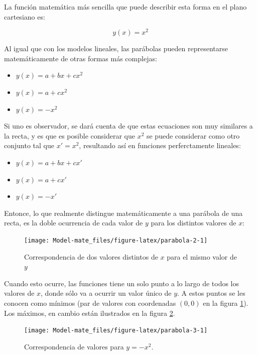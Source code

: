 \documentclass[
]{book}
\providecommand{\tightlist}{%
  \setlength{\itemsep}{0pt}\setlength{\parskip}{0pt}}
\begin{document}
La función matemática más sencilla que puede describir esta forma en el plano cartesiano es:

\begin{equation}
    y(x) = x^2
\end{equation}

Al igual que con los modelos lineales, las parábolas pueden representarse matemáticamente de otras formas más complejas:

\begin{itemize}
\tightlist
\item
  \(y(x) = a + bx + cx^2\)
\item
  \(y(x) = a + cx^2\)
\item
  \(y(x) = -x^2\)
\end{itemize}

Si uno es observador, se dará cuenta de que estas ecuaciones son muy similares a la recta, y es que es posible considerar que \(x^2\) se puede considerar como otro conjunto tal que \(x' = x^2\), resultando así en funciones perferctamente lineales:

\begin{itemize}
\tightlist
\item
  \(y(x) = a + bx + cx'\)
\item
  \(y(x) = a + cx'\)
\item
  \(y(x) = -x'\)
\end{itemize}

Entonce, lo que realmente distingue matemáticamente a una parábola de una recta, es la doble ocurrencia de cada valor de \(y\) para los distintos valores de \(x\):

\begin{figure}

{\centering \texttt{[image: Model-mate\_files/figure-latex/parabola-2-1]} 

}

\caption{Correspondencia de dos valores distintos de $x$ para el mismo valor de $y$}\label{fig:parabola-2}
\end{figure}

Cuando esto ocurre, las funciones tiene un solo punto a lo largo de todos los valores de \(x\), donde sólo va a ocurrir un valor único de \(y\). A estos puntos se les conocen como mínimos (par de valores con coordenadas \((0, 0)\) en la figura \ref{fig:parabola-2}). Los máximos, en cambio están ilustrados en la figura \ref{fig:parabola-3}.

\begin{figure}

{\centering \texttt{[image: Model-mate\_files/figure-latex/parabola-3-1]} 

}

\caption{Correspondencia de valores para $y = -x^2$.}\label{fig:parabola-3}
\end{figure}
\end{document}
